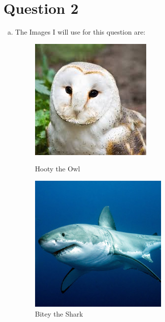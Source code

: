 \documentclass[11pt]{article}
\begin{document}
\section*{Question 2}
\begin{enumerate}[a)]
\item The Images I will use for this question are:
\begin{figure}[h!]
  \begin{minipage}{0.48\textwidth}
    \centering
    \includegraphics[width=0.7\linewidth]{owl.jpg}
    \caption{Hooty the Owl}\label{fig:owl}
  \end{minipage}
  \begin{minipage}{0.48\textwidth}
    \centering
    \includegraphics[width=0.7\linewidth]{shark.jpg}
    \caption{Bitey the Shark}\label{fig:shark}
  \end{minipage}
\end{figure}


\end{enumerate}
\end{document}
